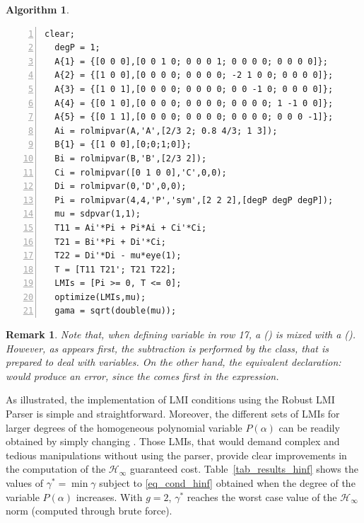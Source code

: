 \documentclass[english,11pt]{article}
\theoremstyle{break} \theorembodyfont{\small\rm}
\newtheorem{rem}{\bf Remark}
\newtheorem{algorithm}{\bf Algorithm}
\newenvironment{remark}
{\begin{rem}} {\hspace*{\fill}\nolinebreak[1]
\end{rem}
}
\newcommand{\Hi}{{\mathcal{H}}_{\infty}}
\begin{document}
\begin{minipage}{16.0cm}\label{algo_hinf}
\begin{algorithm}
\begin{lstlisting}[numbers=left]
  clear;
  degP = 1;
  A{1} = {[0 0 0],[0 0 1 0; 0 0 0 1; 0 0 0 0; 0 0 0 0]};
  A{2} = {[1 0 0],[0 0 0 0; 0 0 0 0; -2 1 0 0; 0 0 0 0]};
  A{3} = {[1 0 1],[0 0 0 0; 0 0 0 0; 0 0 -1 0; 0 0 0 0]};
  A{4} = {[0 1 0],[0 0 0 0; 0 0 0 0; 0 0 0 0; 1 -1 0 0]};
  A{5} = {[0 1 1],[0 0 0 0; 0 0 0 0; 0 0 0 0; 0 0 0 -1]};
  Ai = rolmipvar(A,'A',[2/3 2; 0.8 4/3; 1 3]);
  B{1} = {[1 0 0],[0;0;1;0]};
  Bi = rolmipvar(B,'B',[2/3 2]);
  Ci = rolmipvar([0 1 0 0],'C',0,0);
  Di = rolmipvar(0,'D',0,0);
  Pi = rolmipvar(4,4,'P','sym',[2 2 2],[degP degP degP]);
  mu = sdpvar(1,1);
  T11 = Ai'*Pi + Pi*Ai + Ci'*Ci;
  T21 = Bi'*Pi + Di'*Ci;
  T22 = Di'*Di - mu*eye(1);
  T = [T11 T21'; T21 T22];
  LMIs = [Pi >= 0, T <= 0];
  optimize(LMIs,mu);
  gama = sqrt(double(mu));
\end{lstlisting}
\end{algorithm}
\end{minipage}


\begin{remark}\label{rem_issues}
Note that, when defining variable  in row 17, a  () is mixed with a  (). 
However, as  appears first, the subtraction is 
performed by the  class, that is prepared to deal with  variables. On the other hand, the equivalent 
declaration:  would produce an error, since the  comes first in the expression.
\end{remark}


As illustrated, the implementation
of LMI conditions using the Robust LMI Parser is simple and
straightforward. Moreover, the different sets of LMIs for larger
degrees of the homogeneous polynomial variable $P(\alpha)$
can be readily obtained by simply changing .
Those LMIs, that would demand complex and
tedious manipulations without using the parser, provide clear improvements
in the computation of the $\Hi$ guaranteed cost. Table~\ref{tab_results_hinf}
 shows the values of $\gamma^{\ast} = \min \gamma$ subject to \eqref{eq_cond_hinf} 
obtained when the degree of the variable $P(\alpha)$ increases. 
With $g=2$, $\gamma^{\ast}$ reaches the worst case value of the $\Hi$ norm
(computed through brute force). 
\end{document}
